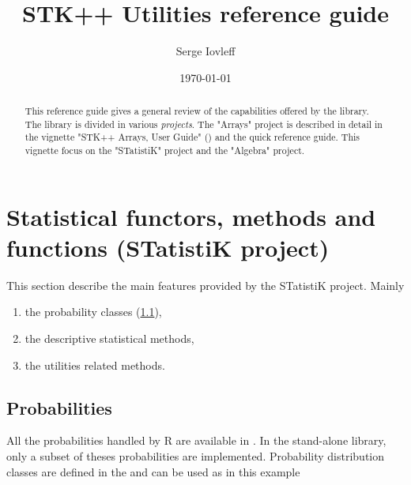 \documentclass[a4paper,10pt]{article}
\title{STK++ Utilities reference guide}
\author{Serge Iovleff}
\date{\today}
\begin{document}


\maketitle

\begin{abstract}
This reference guide gives a general review of the capabilities offered
by the \stkpp{} library. The library is divided in various \emph{projects}.
The "Arrays" project is described in detail in the vignette "STK++ Arrays,
User Guide" (\cite{rtkore-Arrays}) and the quick reference guide.
This vignette focus on the "STatistiK" project and the "Algebra" project.
\end{abstract}

\tableofcontents

\section{Statistical functors, methods and functions (STatistiK project)}
\label{sec:STatistiK}

This section describe the main features provided by the STatistiK project. Mainly
\begin{enumerate}
\item the probability classes (\ref{subsec:prob}),
\item the descriptive statistical methods,
\item the utilities related methods.
\end{enumerate}

\subsection{Probabilities }
\label{subsec:prob}
All the probabilities handled by R are available in \rtkore{}. In the stand-alone \stkpp{} library, only a
subset of theses probabilities are implemented. Probability distribution classes are defined in the
 and can be used as in this example

\begin{minipage}[t]{0.66\textwidth}

\end{minipage}
\hspace{0.2cm}
\begin{minipage}[t]{0.33\textwidth}
\addtocounter{lstlisting}{-1}

\end{minipage}
\end{document}
